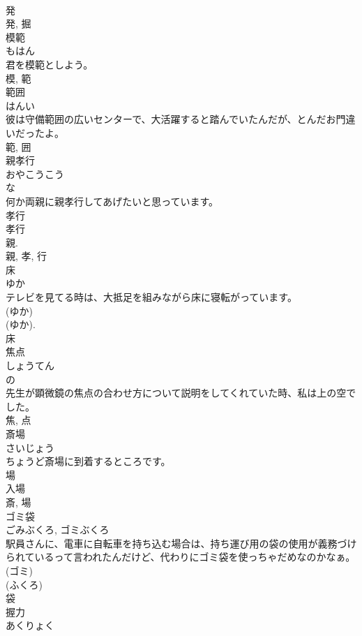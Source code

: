 \documentclass[8pt]{extreport}
\begin{document}
\begin{CJK}{UTF8}{min}
\\	発 
\\	発, 掘	
\\	模範	
\\	もはん	
\\	君を模範としよう。	
\\	模, 範	
\\	範囲	
\\	はんい	
\\	彼は守備範囲の広いセンターで、大活躍すると踏んでいたんだが、とんだお門違いだったよ。	
\\	範, 囲	
\\	親孝行	
\\	おやこうこう	
\\	な 
\\	何か両親に親孝行してあげたいと思っています。	
\\	孝行 
\\	孝行 
\\	親. 
\\	親, 孝, 行	
\\	床	
\\	ゆか	
\\	テレビを見てる時は、大抵足を組みながら床に寝転がっています。	
\\	(ゆか) 
\\	(ゆか). 
\\	床	
\\	焦点	
\\	しょうてん	
\\	の 
\\	先生が顕微鏡の焦点の合わせ方について説明をしてくれていた時、私は上の空でした。	
\\	焦, 点	
\\	斎場	
\\	さいじょう	
\\	ちょうど斎場に到着するところです。	
\\	場 
\\	入場 
\\	斎, 場	
\\	ゴミ袋	
\\	ごみぶくろ, ゴミぶくろ	
\\	駅員さんに、電車に自転車を持ち込む場合は、持ち運び用の袋の使用が義務づけられているって言われたんだけど、代わりにゴミ袋を使っちゃだめなのかなぁ。	
\\	(ゴミ) 
\\	(ふくろ) 
\\	袋	
\\	握力	
\\	あくりょく	

\end{CJK}
\end{document}
